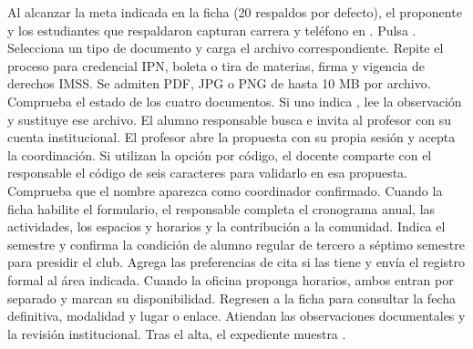 Al alcanzar la meta indicada en la ficha (20 respaldos por defecto), el proponente y los estudiantes que respaldaron capturan carrera y teléfono en . Pulsa . Selecciona un tipo de documento y carga el archivo correspondiente. Repite el proceso para credencial IPN, boleta o tira de materias, firma y vigencia de derechos IMSS. Se admiten PDF, JPG o PNG de hasta 10 MB por archivo. Comprueba el estado de los cuatro documentos. Si uno indica , lee la observación y sustituye ese archivo.
El alumno responsable busca e invita al profesor con su cuenta institucional. El profesor abre la propuesta con su propia sesión y acepta la coordinación. Si utilizan la opción por código, el docente comparte con el responsable el código de seis caracteres para validarlo en esa propuesta. Comprueba que el nombre aparezca como coordinador confirmado.
Cuando la ficha habilite el formulario, el responsable completa el cronograma anual, las actividades, los espacios y horarios y la contribución a la comunidad. Indica el semestre y confirma la condición de alumno regular de tercero a séptimo semestre para presidir el club. Agrega las preferencias de cita si las tiene y envía el registro formal al área indicada.
Cuando la oficina proponga horarios, ambos entran por separado y marcan su disponibilidad. Regresen a la ficha para consultar la fecha definitiva, modalidad y lugar o enlace. Atiendan las observaciones documentales y la revisión institucional. Tras el alta, el expediente muestra .

